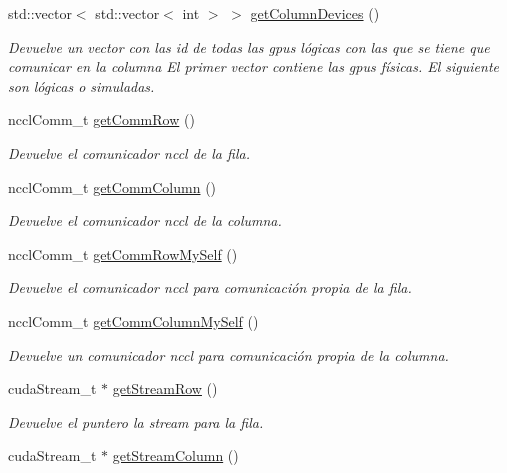 \begin{DoxyCompactItemize}
std\+::vector$<$ std\+::vector$<$ int $>$ $>$ \hyperlink{classCommSummaElement_a8b427d9631c71cb0be842c51a2afbca5}{get\+Column\+Devices} ()
\begin{DoxyCompactList}\small\item\em Devuelve un vector con las id de todas las gpus lógicas con las que se tiene que comunicar en la columna El primer vector contiene las gpus físicas. El siguiente son lógicas o simuladas. \end{DoxyCompactList}\item 
nccl\+Comm\+\_\+t \hyperlink{classCommSummaElement_abfc478b14943a693dc3c42ea06d4e947}{get\+Comm\+Row} ()
\begin{DoxyCompactList}\small\item\em Devuelve el comunicador nccl de la fila. \end{DoxyCompactList}\item 
nccl\+Comm\+\_\+t \hyperlink{classCommSummaElement_aa253429acb0372db823119d855e81324}{get\+Comm\+Column} ()
\begin{DoxyCompactList}\small\item\em Devuelve el comunicador nccl de la columna. \end{DoxyCompactList}\item 
nccl\+Comm\+\_\+t \hyperlink{classCommSummaElement_a1fc217055366930113af68024e634f83}{get\+Comm\+Row\+My\+Self} ()
\begin{DoxyCompactList}\small\item\em Devuelve el comunicador nccl para comunicación propia de la fila. \end{DoxyCompactList}\item 
nccl\+Comm\+\_\+t \hyperlink{classCommSummaElement_afe3e0bcd32d05461b70f35adbc1f7b83}{get\+Comm\+Column\+My\+Self} ()
\begin{DoxyCompactList}\small\item\em Devuelve un comunicador nccl para comunicación propia de la columna. \end{DoxyCompactList}\item 
cuda\+Stream\+\_\+t $\ast$ \hyperlink{classCommSummaElement_a640cfe543eff74f51e8bf415175c5f83}{get\+Stream\+Row} ()
\begin{DoxyCompactList}\small\item\em Devuelve el puntero la stream para la fila. \end{DoxyCompactList}\item 
cuda\+Stream\+\_\+t $\ast$ \hyperlink{classCommSummaElement_a15fa7d90624407f178b9e08a2406e5c8}{get\+Stream\+Column} ()

\end{DoxyCompactItemize}

